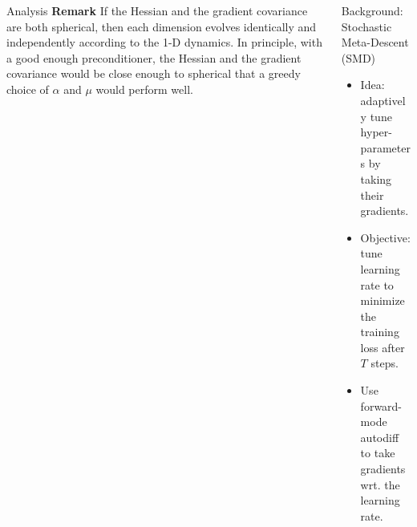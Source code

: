 \documentclass[final,t]{beamer}
\begin{document}
\begin{frame}{}
\begin{columns}[t]
\begin{column}{.32\linewidth}
\begin{exampleblock}{Analysis}
    \vspace{0.5in}
    \textbf{Remark} If the Hessian and the gradient covariance are both spherical, then each dimension evolves identically and independently according to the 1-D dynamics. In principle, with a good enough preconditioner, the Hessian and the gradient covariance would be close enough to spherical that a greedy choice of $\alpha$ and $\mu$ would perform well. 
    \end{exampleblock}
    
\end{column}
\vspace{0pt}

\begin{column}{.32\linewidth}
    \vskip -0.5cm
    
    \begin{exampleblock}{Background: Stochastic Meta-Descent (SMD)}
    \begin{itemize}
        \item Idea: adaptively tune hyper-parameters by taking their gradients.
        \item Objective: tune learning rate to minimize the training loss after $T$ steps.
        \item Use forward-mode autodiff to take gradients wrt. the learning rate.
    \end{itemize}
    \vskip 0.5cm
    \end{exampleblock}
    

\end{column}
\end{columns}
\end{frame}
\end{document}
